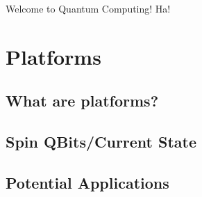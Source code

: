\documentclass[a4paper]{article}
\begin{document}
Welcome to Quantum Computing! Ha!

\section{Platforms}
\label{ref:platforms}
\subsection{What are platforms?}
\subsection{Spin QBits/Current State}
\subsection{Potential Applications}
\label{ref:applications}
\printbibliography
\nocite{*}
\end{document}
